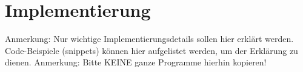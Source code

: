 \chapter{Implementierung}

Anmerkung: Nur wichtige Implementierungsdetails sollen hier erklärt
werden. Code-Beispiele (snippets) können hier aufgelistet werden, um der
Erklärung zu dienen. 
Anmerkung: Bitte KEINE ganze Programme hierhin kopieren!
